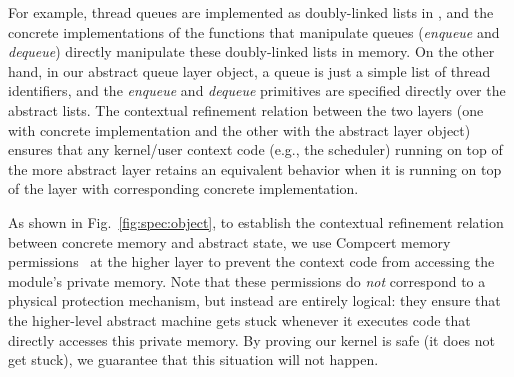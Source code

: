 {For example, thread queues are implemented as doubly-linked lists
in \mCTOS{}, and the concrete implementations of the functions that
manipulate queues ({\it enqueue} and
{\it dequeue}) directly manipulate these doubly-linked lists in memory.
On the other hand, in our abstract queue layer object, a queue
is just a simple list of thread identifiers, and 
the {\it enqueue} and {\it dequeue} primitives are
specified directly over the abstract lists.
The contextual refinement relation between
the two layers (one with concrete implementation and the other
with the abstract layer object) ensures that any kernel/user context code
(e.g., the scheduler) running on top of the more abstract layer retains an
equivalent behavior when it is running on top of the layer with corresponding
concrete implementation.

As shown in Fig.~\ref{fig:spec:object},
to establish the contextual refinement relation
between concrete memory and abstract state,
we use Compcert memory permissions~\cite{leroy08} at the higher layer
to prevent the context code
from accessing the module's private memory.
Note that these permissions do \emph{not}
correspond to a physical protection mechanism,
but instead are entirely logical:
they ensure that the higher-level abstract machine
gets stuck whenever it executes
code that directly accesses this private memory.
By proving our kernel is safe (it does not get stuck),
we guarantee that this situation will not happen.

}
